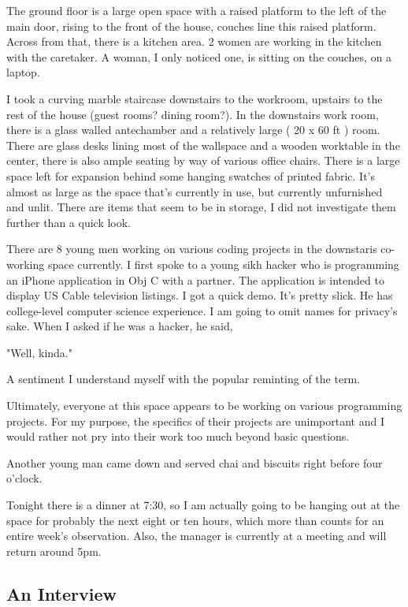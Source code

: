 \documentclass[11pt]{amsart}
\begin{document}
The ground floor is a large open space with a raised platform to the left of the main door, rising to the front of the house, couches line this raised platform. Across from that, there is a kitchen area. 2 women are working in the kitchen with the caretaker. A woman, I only noticed one, is sitting on the couches, on a laptop.

I took a curving marble staircase downstairs to the workroom, upstairs to the rest of the house (guest rooms? dining room?). In the downstairs work room, there is a glass walled antechamber and a relatively large ( 20 x 60 ft ) room. There are glass desks lining most of the wallspace and a wooden worktable in the center, there is also ample seating by way of various office chairs. There is a large space left for expansion behind some hanging swatches of printed fabric. It's almost as large as the space that's currently in use, but currently unfurnished and unlit. There are items that seem to be in storage, I did not investigate them further than a quick look.

There are 8 young men working on various coding projects in the downstaris co-working space currently. I first spoke to a young sikh hacker who is programming an iPhone application in Obj C with a partner. The application is intended to display US Cable television listings. I got a quick demo. It's pretty slick. He has college-level computer science experience. I am going to omit names for privacy's sake. When I asked if he was a hacker, he said, 

"Well, kinda." 

A sentiment I understand myself with the popular reminting of the term.

Ultimately, everyone at this space appears to be working on various programming projects. For my purpose, the specifics of their projects are unimportant and I would rather not pry into their work too much beyond basic questions.

Another young man came down and served chai and biscuits right before four o'clock.

Tonight there is a dinner at 7:30, so I am actually going to be hanging out at the space for probably the next eight or ten hours, which more than counts for an entire week's observation. Also, the manager is currently at a meeting and will return around 5pm.

\subsection{An Interview}
\end{document}
